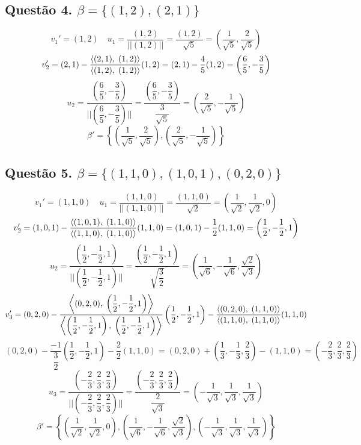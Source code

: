 \documentclass[12pt]{article}
\begin{document}
\subsection{Questão 4. $\beta = \lbrace (1,2),(2,1) \rbrace$}

\[v_{1}' = (1,2) \quad u_{1} = \dfrac{(1,2)}{||(1,2)||} = \dfrac{(1,2)}{\sqrt{5}} = \left( \dfrac{1}{\sqrt{5}}, \dfrac{2}{\sqrt{5}} \right)\]
\[v_{2}' = (2,1) - \dfrac{\left\langle(2,1),\;(1,2)\right\rangle}{\left\langle(1,2),\;(1,2)\right\rangle} (1,2) = (2,1) - \dfrac{4}{5} (1,2) = \left( \dfrac{6}{5}, -\dfrac{3}{5} \right)\]
\[u_{2} = \dfrac{\left( \dfrac{6}{5}, -\dfrac{3}{5} \right)}{\biggr|\biggr| \left( \dfrac{6}{5}, -\dfrac{3}{5} \right) \biggr|\biggr|} = \dfrac{\left( \dfrac{6}{5}, -\dfrac{3}{5} \right)}{\dfrac{3}{\sqrt{5}}} = \left( \dfrac{2}{\sqrt{5}}, -\dfrac{1}{\sqrt{5}} \right)\]
\[\beta' = \left\lbrace \left( \dfrac{1}{\sqrt{5}}, \dfrac{2}{\sqrt{5}} \right), \left( \dfrac{2}{\sqrt{5}}, -\dfrac{1}{\sqrt{5}} \right) \right\rbrace\]

\subsection{Questão 5. $\beta = \lbrace (1,1,0), (1,0,1), (0,2,0) \rbrace$}

\[v_{1}' = (1,1,0) \quad u_{1} = \dfrac{(1,1,0)}{||(1,1,0)||} = \dfrac{(1,1,0)}{\sqrt{2}} = \left( \dfrac{1}{\sqrt{2}}, \dfrac{1}{\sqrt{2}}, 0 \right)\]
\[v_{2}' = (1,0,1) - \dfrac{\left\langle(1,0,1),\;(1,1,0)\right\rangle}{\left\langle(1,1,0),\;(1,1,0)\right\rangle} (1,1,0) = (1,0,1) - \dfrac{1}{2}(1,1,0) = \left( \dfrac{1}{2}, -\dfrac{1}{2}, 1\right)\]
\[u_{2} = \dfrac{\left( \dfrac{1}{2}, -\dfrac{1}{2}, 1\right)}{\biggr|\biggr| \left( \dfrac{1}{2}, -\dfrac{1}{2}, 1\right) \biggr|\biggr|} = \dfrac{\left( \dfrac{1}{2}, -\dfrac{1}{2}, 1\right)}{\sqrt{\dfrac{3}{2}}} = \left( \dfrac{1}{\sqrt{6}}, -\dfrac{1}{\sqrt{6}}, \dfrac{\sqrt{2}}{\sqrt{3}}\right)\]
\[v_{3}' = (0,2,0) - \dfrac{\left\langle(0,2,0),\;\left( \dfrac{1}{2}, -\dfrac{1}{2}, 1\right)\right\rangle}{\left\langle\left( \dfrac{1}{2}, -\dfrac{1}{2}, 1\right),\;\left( \dfrac{1}{2}, -\dfrac{1}{2}, 1\right)\right\rangle} \left( \dfrac{1}{2}, -\dfrac{1}{2}, 1\right) - \dfrac{\left\langle(0,2,0),\;(1,1,0)\right\rangle}{\left\langle(1,1,0),\;(1,1,0)\right\rangle} (1,1,0)\]
\[(0,2,0) - \dfrac{-1}{\dfrac{3}{2}} \left( \dfrac{1}{2}, -\dfrac{1}{2}, 1\right) - \dfrac{2}{2}(1,1,0) = (0,2,0) + \left( \dfrac{1}{3}, -\dfrac{1}{3}, \dfrac{2}{3} \right) - (1,1,0) = \left( -\dfrac{2}{3}, \dfrac{2}{3}, \dfrac{2}{3} \right)\]
\[u_{3} = \dfrac{\left( -\dfrac{2}{3}, \dfrac{2}{3}, \dfrac{2}{3} \right)}{\biggr|\biggr| \left( -\dfrac{2}{3}, \dfrac{2}{3}, \dfrac{2}{3} \right) \biggr|\biggr|} = \dfrac{\left( -\dfrac{2}{3}, \dfrac{2}{3}, \dfrac{2}{3} \right)}{\dfrac{2}{\sqrt{3}}} = \left( -\dfrac{1}{\sqrt{3}}, \dfrac{1}{\sqrt{3}}, \dfrac{1}{\sqrt{3}}\right)\]
\[\beta' = \left\lbrace \left( \dfrac{1}{\sqrt{2}}, \dfrac{1}{\sqrt{2}}, 0 \right), \left( \dfrac{1}{\sqrt{6}}, -\dfrac{1}{\sqrt{6}}, \dfrac{\sqrt{2}}{\sqrt{3}}\right), \left( -\dfrac{1}{\sqrt{3}}, \dfrac{1}{\sqrt{3}}, \dfrac{1}{\sqrt{3}}\right) \right\rbrace\]
\end{document}
